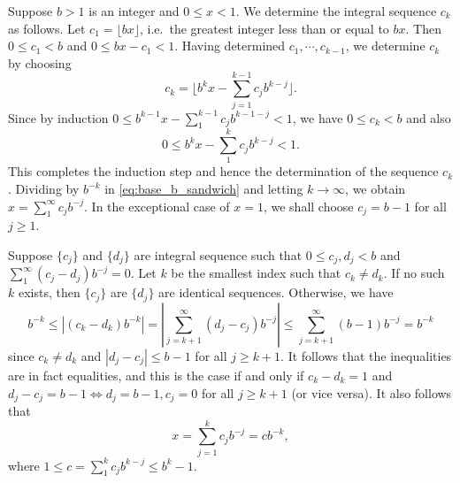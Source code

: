 \begin{exercise}{3.1}
  Suppose $b > 1$ is an integer and $0 \le x < 1$.
  We determine the integral sequence $c_k$ as follows.
  Let $c_1 = \lfloor bx \rfloor$, i.e.\
  the greatest integer less than or equal to $bx$.
  Then $0 \le c_1 < b$ and $0 \le bx - c_1 < 1$.
  Having determined $c_1, \cdots, c_{k-1}$,
  we determine $c_k$ by choosing
  \[
    c_k = \lfloor b^k x - \sum_{j=1}^{k-1} c_j b^{k-j} \rfloor.
  \]
  Since by induction $0 \le b^{k-1} x - \sum_1^{k-1} c_j b^{k-1-j} < 1$,
  we have $0 \le c_k < b$ and also
  \begin{equation}
    0 \le b^k x - \sum_1^{k} c_j b^{k-j} < 1.
    \label{eq:base_b_sandwich}
  \end{equation}
  This completes the induction step and
  hence the determination of the sequence $c_k$.
  Dividing by $b^{-k}$ in \eqref{eq:base_b_sandwich}
  and letting $k \rightarrow \infty$,
  we obtain $x = \sum_1^{\infty} c_j b^{-j}$.
  In the exceptional case of $x = 1$,
  we shall choose $c_j = b-1$ for all $j \ge 1$.

  Suppose $\{c_j\}$ and $\{d_j\}$ are integral sequence
  such that $0 \le c_j, d_j < b$ and
  $\sum_{1}^{\infty} (c_j - d_j) b^{-j} = 0$.
  Let $k$ be the smallest index such that $c_k \neq d_k$.
  If no such $k$ exists, then $\{c_j\}$ are $\{d_j\}$ are identical sequences.
  Otherwise, we have
  \[
    b^{-k} \le \left| \left( c_k - d_k \right) b^{-k} \right|
    = \left| \sum_{j=k+1}^{\infty} \left( d_j - c_j \right) b^{-j} \right|
    \le \sum_{j=k+1}^{\infty} (b-1) b^{-j}
    = b^{-k}
  \]
  since $c_k \neq d_k$ and $|d_j - c_j| \le b-1$ for all $j \ge k+1$.
  It follows that the inequalities are in fact equalities,
  and this is the case if and only if
  $c_k - d_k = 1$ and $d_j - c_j = b-1 \Leftrightarrow d_j = b-1, c_j = 0$
  for all $j \ge k+1$ (or vice versa).
  It also follows that
  \[
    x = \sum_{j=1}^k c_j b^{-j} = c b^{-k},
  \]
  where $1 \le c = \sum_1^k c_j b^{k-j} \le b^k-1$.
\end{exercise}

